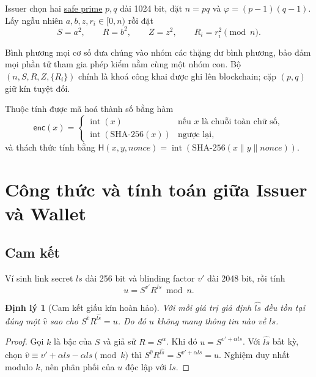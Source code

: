 \documentclass[a4paper,11pt,oneside]{report}
\theoremstyle{definition}
\theoremstyle{plain}
\newtheorem{theorem}[definition]{Định lý}
\newcommand{\g}[2]{\hyperref[term:#1]{#2}}
\newcommand{\Hash}{\mathsf{H}}
\newcommand{\enc}{\mathsf{enc}}
\begin{document}
Issuer chọn hai \g{safeprime}{safe prime} $p, q$ dài 1024 bit, đặt $n = pq$ và
$\varphi = (p-1)(q-1)$. Lấy ngẫu nhiên $a, b, z, r_i \in [0, n)$ rồi đặt
\[
S = a^2, \qquad R = b^2, \qquad Z = z^2, \qquad R_i = r_i^2 \pmod n .
\]

Bình phương mọi cơ số đưa chúng vào nhóm các thặng dư bình phương, bảo đảm mọi phần tử tham gia
phép kiểm nằm cùng một nhóm con. Bộ $(n, S, R, Z, \{R_i\})$ chính là khoá công khai
được ghi lên blockchain; cặp $(p, q)$ giữ kín tuyệt đối.

Thuộc tính được mã hoá thành số bằng hàm
\[
\enc(x) =
\begin{cases}
\operatorname{int}(x) & \text{nếu } x \text{ là chuỗi toàn chữ số},\\
\operatorname{int}(\mathrm{SHA\text{-}256}(x)) & \text{ngược lại,}
\end{cases}
\]
và thách thức tính bằng
$\Hash(x, y, \mathit{nonce}) = \operatorname{int}(\mathrm{SHA\text{-}256}(x \| y \| \mathit{nonce}))$.

\section{Công thức và tính toán giữa Issuer và Wallet}

\subsection{Cam kết}

Ví sinh link secret $\mathit{ls}$ dài 256 bit và blinding factor
$v'$ dài 2048 bit, rồi tính
\begin{equation}
u = S^{v'} R^{\mathit{ls}} \bmod n .
\end{equation}

\begin{theorem}[Cam kết giấu kín hoàn hảo]
Với mỗi giá trị giả định $\widehat{\mathit{ls}}$ đều tồn tại đúng một $\widehat{v}$ sao cho
$S^{\widehat v} R^{\widehat{\mathit{ls}}} = u$. Do đó $u$ không mang thông tin nào về
$\mathit{ls}$.
\end{theorem}

\begin{proof}
Gọi $k$ là bậc của $S$ và giả sử $R = S^{\alpha}$. Khi đó $u = S^{v' + \alpha \mathit{ls}}$. Với
$\widehat{\mathit{ls}}$ bất kỳ, chọn
$\widehat v \equiv v' + \alpha\mathit{ls} - \alpha\widehat{\mathit{ls}} \pmod k$ thì
$S^{\widehat v} R^{\widehat{\mathit{ls}}} = S^{v' + \alpha\mathit{ls}} = u$. Nghiệm duy nhất
modulo $k$, nên phân phối của $u$ độc lập với $\mathit{ls}$.
\end{proof}
\end{document}
